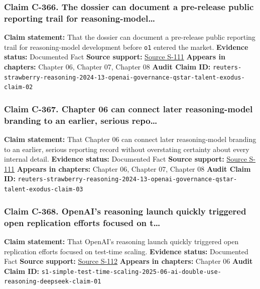 \documentclass[
  american,
  11pt,
  letterpaper,
]{article}
\begin{document}
\subsubsection{Claim C-366. The dossier can document a pre-release
public reporting trail for
reasoning-model\ldots{}}\label{claim-c-366-the-dossier-can-document-a-pre-release-public-reporting-trail-for-reasoning-model}

\textbf{Claim statement:} That the dossier can document a pre-release
public reporting trail for reasoning-model development before
\texttt{o1} entered the market. \textbf{Evidence status:} Documented
Fact \textbf{Source support:}
\hyperref[source-s-111-exclusive-openai-working-on-new-reasoning-technology-under-code-name-strawberry]{Source
S-111} \textbf{Appears in chapters:} Chapter 06, Chapter 07, Chapter 08
\textbf{Audit Claim ID:}
\texttt{reuters-strawberry-reasoning-2024-13-openai-governance-qstar-talent-exodus-claim-02}

\subsubsection{Claim C-367. Chapter 06 can connect later reasoning-model
branding to an earlier, serious
repo\ldots{}}\label{claim-c-367-chapter-06-can-connect-later-reasoning-model-branding-to-an-earlier-serious-repo}

\textbf{Claim statement:} That Chapter 06 can connect later
reasoning-model branding to an earlier, serious reporting record without
overstating certainty about every internal detail. \textbf{Evidence
status:} Documented Fact \textbf{Source support:}
\hyperref[source-s-111-exclusive-openai-working-on-new-reasoning-technology-under-code-name-strawberry]{Source
S-111} \textbf{Appears in chapters:} Chapter 06, Chapter 07, Chapter 08
\textbf{Audit Claim ID:}
\texttt{reuters-strawberry-reasoning-2024-13-openai-governance-qstar-talent-exodus-claim-03}

\subsubsection{Claim C-368. OpenAI's reasoning launch quickly triggered
open replication efforts focused on
t\ldots{}}\label{claim-c-368-openai-s-reasoning-launch-quickly-triggered-open-replication-efforts-focused-on-t}

\textbf{Claim statement:} That OpenAI's reasoning launch quickly
triggered open replication efforts focused on test-time scaling.
\textbf{Evidence status:} Documented Fact \textbf{Source support:}
\hyperref[source-s-112-s1-simple-test-time-scaling]{Source S-112}
\textbf{Appears in chapters:} Chapter 06 \textbf{Audit Claim ID:}
\texttt{s1-simple-test-time-scaling-2025-06-ai-double-use-reasoning-deepseek-claim-01}
\end{document}
